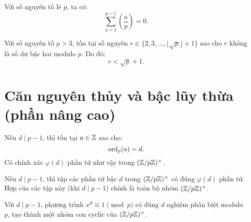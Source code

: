 \documentclass[../imo-training-open-book.tex]{subfiles}
\begin{document}
\vspace{1em}

\begin{corollary*}
    \label{corollary:legendre-sum-zero}
    Với số nguyên tố lẻ \( p \), ta có:
    \[
        \sum_{a = 1}^{p - 1} \left( \frac{a}{p} \right) = 0.
    \]
\end{corollary*}

\vspace{1em}

\begin{theorem}
    \label{theorem:least-quadratic-nonresidue}
    Với số nguyên tố \( p > 3 \), tồn tại số nguyên \( r \in \{2, 3, \ldots, \lfloor \sqrt{p} \rfloor + 1\} \) sao cho \( r \) không là số dư bậc hai modulo \( p \). Do đó:
    \[
        r < \sqrt{p} + 1.
    \]
\end{theorem}

\newpage

\section{Căn nguyên thủy và bậc lũy thừa (phần nâng cao)}

\begin{lemma}
    \label{lemma:exists-order-d}
    Nếu \( d \mid p - 1 \), thì tồn tại \( a \in \mathbb Z \) sao cho:
    \[
        \operatorname{ord}_p(a) = d.
    \]
    Có chính xác \( \varphi(d) \) phần tử như vậy trong \( (\mathbb Z/p\mathbb Z)^\times \).
\end{lemma}

\vspace{1em}

\begin{theorem}
    \label{theorem:residue-class-order-d}
    Nếu \( d \mid p - 1 \), thì tập các phần tử bậc \( d \) trong \( (\mathbb Z/p\mathbb Z)^\times \) có đúng \( \varphi(d) \) phần tử. Hợp của các tập này (khi \( d \mid p - 1 \)) chính là toàn bộ nhóm \( (\mathbb Z/p\mathbb Z)^\times \).
\end{theorem}

\vspace{1em}

\begin{theorem}
    \label{theorem:roots-of-unity-mod-p}
    Với \( d \mid p - 1 \), phương trình \( x^d \equiv 1 \pmod{p} \) có đúng \( d \) nghiệm phân biệt modulo \( p \), tạo thành một nhóm con cyclic của \( (\mathbb Z/p\mathbb Z)^\times \).
\end{theorem}
\end{document}
